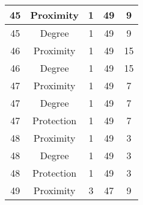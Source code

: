 \documentclass[results.tex]{subfiles}
\begin{document}
\begin{center}
\begin{tabular}{| c || c | c | c | c |}
            \hline
            45                      & Proximity                    & 1                      & 49                      & 9                    \\
            \hline
            45                      & Degree                       & 1                      & 49                      & 9                    \\
            \hline
            46                      & Proximity                    & 1                      & 49                      & 15                   \\
            \hline
            46                      & Degree                       & 1                      & 49                      & 15                   \\
            \hline
            47                      & Proximity                    & 1                      & 49                      & 7                    \\
            \hline
            47                      & Degree                       & 1                      & 49                      & 7                    \\
            \hline
            47                      & Protection                   & 1                      & 49                      & 7                    \\
            \hline
            48                      & Proximity                    & 1                      & 49                      & 3                    \\
            \hline
            48                      & Degree                       & 1                      & 49                      & 3                    \\
            \hline
            48                      & Protection                   & 1                      & 49                      & 3                    \\
            \hline
            49                      & Proximity                    & 3                      & 47                      & 9                    \\
            \hline
        \end{tabular}
    \end{center}
\end{document}
